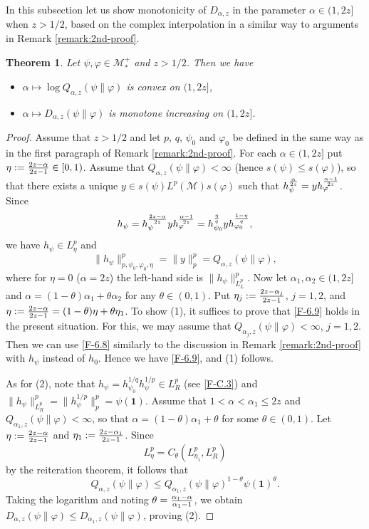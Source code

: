 \documentclass[12pt]{article}
\newtheorem{theorem}{Theorem}[section]
\theoremstyle{definition}
\theoremstyle{remark}
\numberwithin{equation}{section}
\def\Me{\mathcal M}
\def\ffi{\varphi}
\def\1{\mathbf{1}}
\begin{document}
In this subsection let us show monotonicity of $D_{\alpha,z}$ in the parameter $\alpha\in(1,2z]$ when
$z>1/2$, based on the complex interpolation in a similar way {to arguments} in
Remark \ref{remark:2nd-proof}.

\begin{theorem}\label{T-6.6}
Let $\psi,\ffi\in\Me_*^+$ and $z>1/2$. Then we have
\begin{itemize}
\item[(1)] $\alpha\mapsto\log Q_{\alpha,z}(\psi\|\ffi)$ is convex on $(1,2z]$,
\item[(2)] $\alpha\mapsto D_{\alpha,z}(\psi\|\ffi)$ is monotone increasing on $(1,2z]$.
\end{itemize}
\end{theorem}

\begin{proof}
Assume that $z>1/2$ and 
let $p$, $q$, $\psi_0$ and $\ffi_0$ be defined in the same way as in the first paragraph of
Remark \ref{remark:2nd-proof}. For each $\alpha\in(1,2z]$ put $\eta:={2z-\alpha\over2z-1}\in[0,1)$.
Assume that $Q_{\alpha,z}(\psi\|\ffi)<\infty$ (hence $s(\psi)\le s(\ffi)$), so that there exists a unique
$y\in s(\psi)L^p(\Me)s(\ffi)$ such that $h_\psi^{\alpha\over2z}=yh_\ffi^{\alpha-1\over2z}$. Since
\[
h_\psi=h_\psi^{2z-\alpha\over2z}yh_\ffi^{\alpha-1\over2z}
=h_{\psi_0}^{\eta\over q}yh_{\ffi_0}^{1-\eta\over q},
\]
we have $h_\psi\in L^p_\eta$ and
\[
\|h_\psi\|_{p,\psi_0,\ffi_0,\eta}^p=\|y\|_p^p=Q_{\alpha,z}(\psi\|\ffi),
\]
where for $\eta=0$ ($\alpha=2z$) the left-hand side is $\|h_\psi\|_{L^p_L}^p$. Now let
$\alpha_1,\alpha_2\in(1,2z]$ and $\alpha=(1-\theta)\alpha_1+\theta\alpha_2$ for any $\theta\in(0,1)$.
Put $\eta_j:={2z-\alpha_j\over2z-1}$, $j=1,2$, and
$\eta:={2z-\alpha\over2z-1}=(1-\theta)\eta+\theta\eta_1$. To show (1), it suffices to prove that
\eqref{F-6.9} holds in the present situation. For this, we may assume that
$Q_{\alpha_j,z}(\psi\|\ffi)<\infty$, $j=1,2$. Then we can use \eqref{F-6.8} similarly to the discussion
in Remark \ref{remark:2nd-proof} with $h_\psi$ instead of $h_0$. Hence we have \eqref{F-6.9},
and (1) follows.

As for (2), note that $h_\psi=h_{\psi_0}^{1/q}h_\psi^{1/p}\in L^p_R$ (see \eqref{F-C.3}) and
$\|h_\psi\|_{L^p_R}^p=\|h_\psi^{1/p}\|_p^p=\psi(\1)$. Assume that $1<\alpha<\alpha_1\le2z$ and
$Q_{\alpha_1,z}(\psi\|\ffi)<\infty$, so that $\alpha=(1-\theta)\alpha_1+\theta$ for some $\theta\in(0,1)$.
Let $\eta:={2z-\alpha\over2z-1}$ and $\eta_1:={2z-\alpha_1\over2z-1}$. Since
\[
L^p_\eta=C_\theta(L^p_{\eta_1},L^p_R)
\]
by the reiteration theorem, it follows that
\[
Q_{\alpha,z}(\psi\|\ffi)\le Q_{\alpha_1,z}(\psi\|\ffi)^{1-\theta}\psi(\1)^\theta.
\]
Taking the logarithm and noting $\theta={\alpha_1-\alpha\over\alpha_1-1}$, we obtain
$D_{\alpha,z}(\psi\|\ffi)\le D_{\alpha_1,z}(\psi\|\ffi)$, proving (2).
\end{proof}
\end{document}
